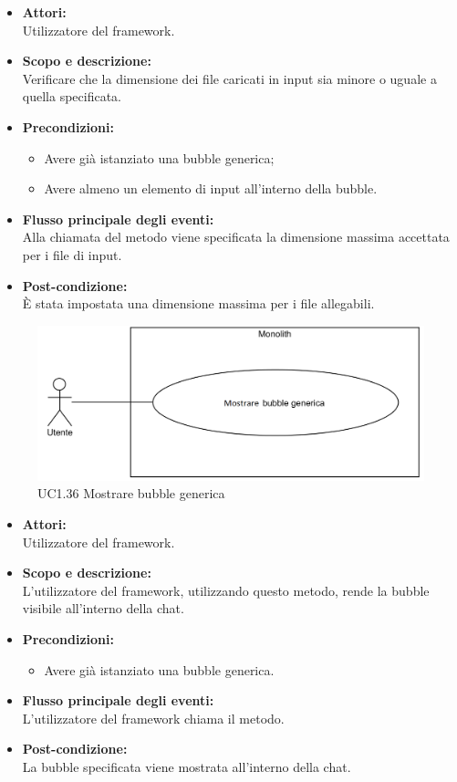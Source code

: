 \begin{itemize}
	\item \textbf{Attori:}
	\\Utilizzatore del framework.
	\item \textbf{Scopo e descrizione:} 
	\\Verificare che la dimensione dei file caricati in input sia minore o uguale a quella specificata.
	\item \textbf{Precondizioni:}
	\begin{itemize}
		\item Avere già istanziato una bubble generica;
		\item Avere almeno un elemento di input all'interno della bubble.
	\end{itemize}
	\item \textbf{Flusso principale degli eventi:}
	\\Alla chiamata del metodo viene specificata la dimensione massima accettata per i file di input.
	\item \textbf{Post-condizione:}
	\\È stata impostata una dimensione massima per i file allegabili.
\end{itemize}


\begin{figure}[H]
	\centering
	\includegraphics[width=15cm]{../../documenti/AnalisiDeiRequisiti/Diagrammi_img/uc1_36.png}
	\caption{UC1.36 Mostrare bubble generica}
\end{figure}

\begin{itemize}
	\item \textbf{Attori:}
	\\Utilizzatore del framework.
	\item \textbf{Scopo e descrizione:} 
	\\L'utilizzatore del framework, utilizzando questo metodo, rende la bubble visibile all'interno della chat.
	\item \textbf{Precondizioni:}
	\begin{itemize}
		\item Avere già istanziato una bubble generica.
	\end{itemize}
	\item \textbf{Flusso principale degli eventi:}
	\\L'utilizzatore del framework chiama il metodo.
	\item \textbf{Post-condizione:}
	\\La bubble specificata viene mostrata all'interno della chat.
\end{itemize}

